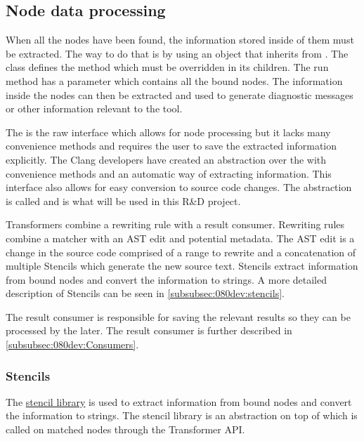 \subsection{Node data processing} \label{subsec:080dev:NodeDataProcessing}

When all the nodes have been found, the information stored inside of them must be extracted. The way to do that is by using an object that inherits from . The  class defines the  method which must be overridden in its children. The run method has a  parameter which contains all the bound nodes. The information inside the nodes can then be extracted and used to generate diagnostic messages or other information relevant to the tool.

The  is the raw interface which allows for node processing but it lacks many convenience methods and requires the user to save the extracted information explicitly. The Clang developers have created an abstraction over the  with convenience methods and an automatic way of extracting information. This interface also allows for easy conversion to source code changes. The abstraction is called  and is what will be used in this R\&D project.

Transformers combine a rewriting rule with a result consumer. Rewriting rules combine a matcher with an AST edit and potential metadata. The AST edit is a change in the source code comprised of a range to rewrite and a concatenation of multiple Stencils which generate the new source text. Stencils extract information from bound nodes and convert the information to strings. A more detailed description of Stencils can be seen in \cref{subsubsec:080dev:stencils}.

The result consumer is responsible for saving the relevant results so they can be processed by the  later. The result consumer is further described in \cref{subsubsec:080dev:Consumers}.

\subsubsection*{Stencils} \label{subsubsec:080dev:stencils}

The \href{https://github.com/llvm/llvm-project/blob/main/clang/include/clang/Tooling/Transformer/Stencil.h}{stencil library} is used to extract information from bound nodes and convert the information to strings.  The stencil library is an abstraction on top of  which is called on matched nodes through the Transformer API. 

